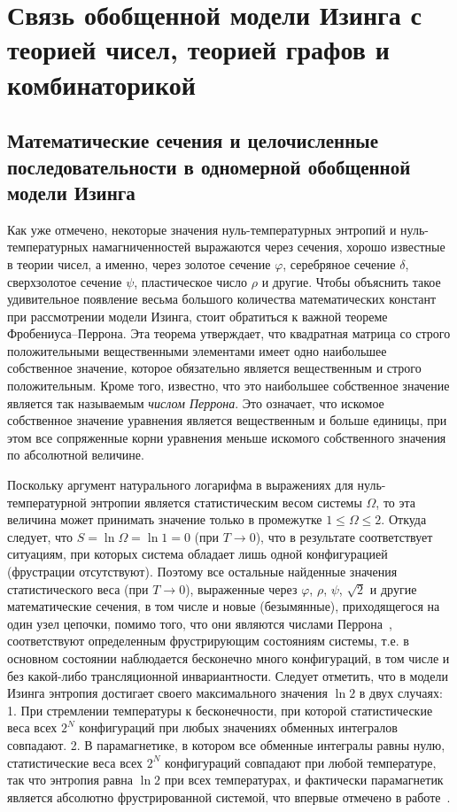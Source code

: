 \chapter{Связь обобщенной модели Изинга с теорией чисел, теорией графов и комбинаторикой}\label{ch:ch5}

\section{Математические сечения и целочисленные последовательности в одномерной обобщенной модели Изинга}

Как уже отмечено, некоторые значения нуль-температурных энтропий и нуль-температурных намагниченностей выражаются через сечения, хорошо известные в теории чисел, а именно, через золотое сечение $\varphi$, серебряное сечение $\delta$, сверхзолотое сечение $\psi$, пластическое число $\rho$ и другие. Чтобы объяснить такое удивительное появление весьма большого количества математических констант при рассмотрении модели Изинга, стоит обратиться к важной теореме Фробениуса--Перрона. Эта теорема утверждает, что квадратная матрица со строго положительными вещественными элементами имеет одно наибольшее собственное значение, которое обязательно является вещественным и строго положительным. Кроме того, известно, что это наибольшее собственное значение является так называемым \emph{числом Перрона}. Это означает, что искомое собственное значение уравнения является вещественным и больше единицы, при этом все сопряженные корни уравнения меньше искомого собственного значения по абсолютной величине. 

Поскольку аргумент натурального логарифма в выражениях для нуль-температурной энтропии является статистическим весом системы $\Omega$, то эта величина может принимать значение только в промежутке $1\leqslant \Omega\leqslant 2$. Откуда следует, что $S= \ln \Omega =  \ln 1 = 0$ (при $T \rightarrow 0$), что в результате соответствует ситуациям, при которых система обладает лишь одной конфигурацией (фрустрации отсутствуют). Поэтому все остальные найденные значения статистического веса (при $T \rightarrow 0$), выраженные через $\varphi$, $\rho$, $\psi$,  $\sqrt{2}$ и другие математические сечения, в том числе и новые (безымянные), приходящегося на один узел цепочки, помимо того, что они являются числами Перрона~\cite{wu2010, lind1992, boyd1985}, соответствуют определенным фрустрирующим состояниям системы, т.е. в основном состоянии наблюдается бесконечно много конфигураций, в том числе и без какой-либо трансляционной инвариантности. Следует отметить, что в модели Изинга энтропия достигает своего максимального значения $\ln 2$ в двух случаях: 1. При стремлении температуры к бесконечности, при которой статистические веса всех $2^N$ конфигураций при любых значениях обменных интегралов совпадают. 2. В парамагнетике, в котором все обменные интегралы равны нулю, статистические веса всех $2^N$ конфигураций совпадают при любой температуре, так что энтропия равна $\ln 2$ при всех температурах, и фактически парамагнетик является абсолютно фрустрированной системой, что впервые отмечено в работе~\cite{zarubin2019}. 

